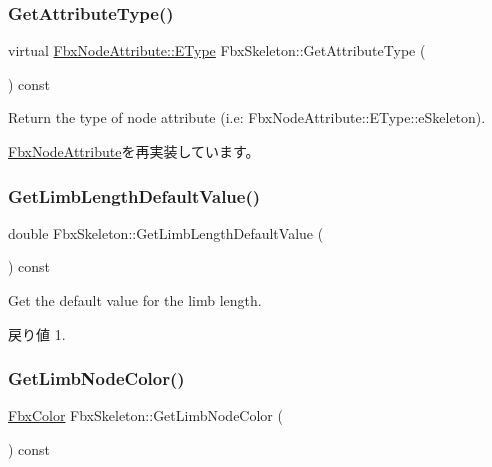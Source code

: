 \subsubsection{\texorpdfstring{Get\+Attribute\+Type()}{GetAttributeType()}}
{\footnotesize\ttfamily virtual \hyperlink{class_fbx_node_attribute_a08e1669d3d1a696910756ab17de56d6a}{Fbx\+Node\+Attribute\+::\+E\+Type} Fbx\+Skeleton\+::\+Get\+Attribute\+Type (\begin{DoxyParamCaption}{ }\end{DoxyParamCaption}) const\hspace{0.3cm}{\ttfamily [virtual]}}



Return the type of node attribute (i.\+e\+: Fbx\+Node\+Attribute\+::\+E\+Type\+::e\+Skeleton). 



\hyperlink{class_fbx_node_attribute_a1c2116756906127145a2b8721fc26752}{Fbx\+Node\+Attribute}を再実装しています。

\mbox{\label{class_fbx_skeleton_ab8ee3f4396ea5cc10988bdc4bb11a993}} 
\subsubsection{\texorpdfstring{Get\+Limb\+Length\+Default\+Value()}{GetLimbLengthDefaultValue()}}
{\footnotesize\ttfamily double Fbx\+Skeleton\+::\+Get\+Limb\+Length\+Default\+Value (\begin{DoxyParamCaption}{ }\end{DoxyParamCaption}) const}

Get the default value for the limb length. \begin{DoxyReturn}{戻り値}
1. 
\end{DoxyReturn}
\mbox{\label{class_fbx_skeleton_a5f3f54bac15d4a4fd51dcb53d987fbf9}} 
\subsubsection{\texorpdfstring{Get\+Limb\+Node\+Color()}{GetLimbNodeColor()}}
{\footnotesize\ttfamily \hyperlink{class_fbx_color}{Fbx\+Color} Fbx\+Skeleton\+::\+Get\+Limb\+Node\+Color (\begin{DoxyParamCaption}{ }\end{DoxyParamCaption}) const}

